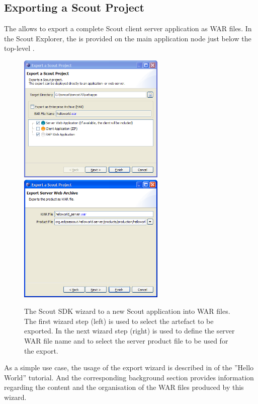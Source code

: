 \documentclass[a4paper,10pt,twoside]{book}
\begin{document}
\subsection{Exporting a Scout Project}

The  allows to export a complete Scout client server application as WAR files. 
In the Scout Explorer, the  is provided on the main application node just below the top-level . 

\begin{figure}
\includegraphics[width=7cm]{wizard_export_1.png} \hspace{5mm}
\includegraphics[width=7cm]{wizard_export_2.png}
\caption{The Scout SDK wizard to a new Scout application into WAR files.
The first wizard step (left) is used to select the artefact to be exported. 
In the next wizard step (right) is used to define the server WAR file name and to select the server product file to be used for the export.}
\end{figure}

As a simple use case, the usage of the export wizard is described in  of the ''Hello World'' tutorial. 
And the corresponding background section  provides information regarding the content and the organisation of the WAR files produced by this wizard. 
\end{document}
